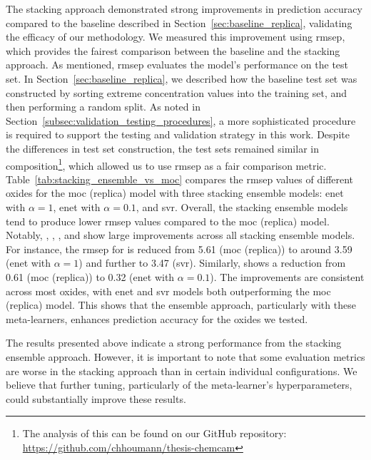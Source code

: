 The stacking approach demonstrated strong improvements in prediction accuracy compared to the baseline described in Section~\ref{sec:baseline_replica}, validating the efficacy of our methodology.
We measured this improvement using \gls{rmsep}, which provides the fairest comparison between the baseline and the stacking approach.
As mentioned, \gls{rmsep} evaluates the model's performance on the test set.
In Section~\ref{sec:baseline_replica}, we described how the baseline test set was constructed by sorting extreme concentration values into the training set, and then performing a random split.
As noted in Section~\ref{subsec:validation_testing_procedures}, a more sophisticated procedure is required to support the testing and validation strategy in this work.
Despite the differences in test set construction, the test sets remained similar in composition\footnote{The analysis of this can be found on our GitHub repository: \url{https://github.com/chhoumann/thesis-chemcam}}, which allowed us to use \gls{rmsep} as a fair comparison metric.
Table~\ref{tab:stacking_ensemble_vs_moc} compares the \gls{rmsep} values of different oxides for the \gls{moc} (replica) model with three stacking ensemble models: \gls{enet} with $\alpha = 1$, \gls{enet} with $\alpha = 0.1$, and \gls{svr}.
Overall, the stacking ensemble models tend to produce lower \gls{rmsep} values compared to the \gls{moc} (replica) model.
Notably, , , , and  show large improvements across all stacking ensemble models.
For instance, the \gls{rmsep} for  is reduced from 5.61 (\gls{moc} (replica)) to around 3.59 (\gls{enet} with $\alpha = 1$) and further to 3.47 (\gls{svr}).
Similarly,  shows a reduction from 0.61 (\gls{moc} (replica)) to 0.32 (\gls{enet} with $\alpha = 0.1$).
The improvements are consistent across most oxides, with \gls{enet} and \gls{svr} models both outperforming the \gls{moc} (replica) model.
This shows that the ensemble approach, particularly with these meta-learners, enhances prediction accuracy for the oxides we tested.

The results presented above indicate a strong performance from the stacking ensemble approach.
However, it is important to note that some evaluation metrics are worse in the stacking approach than in certain individual configurations.
We believe that further tuning, particularly of the meta-learner's hyperparameters, could substantially improve these results.

